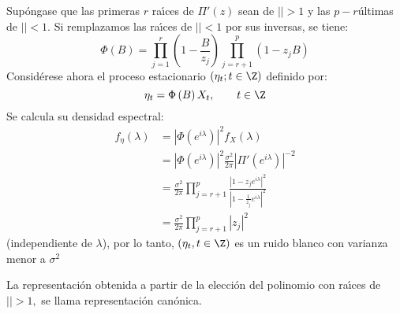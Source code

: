 \begin{observacion}
\begin{enumerate}
Sup\'{o}ngase que las primeras $r$ ra\'{\i}ces de $\Pi'(z)$ sean de 
$\left| \right|>1$ y las $p-r $\'{u}ltimas de $\left| \right|<1$. Si remplazamos 
las ra\'{\i}ces de $\left| \right|<1$ por sus inversas, se tiene: 
\[
\Phi (B)=\prod_{j=1}^{r} \left( {1-\frac{B}{z_{j} }} 
\right)\prod_{j=r+1}^{p} \left( {1-z_{j} B} \right)
\]
Consid\'{e}rese ahora el proceso estacionario $\left( {\eta_{t} ;t\in \Z} \right)$ definido por:
\[
\eta_{t} =\Phi \left( B \right)X_{t} ,
\qquad t\in \Z
\]
Se calcula su densidad espectral: 
\begin{align*}
 f_{\eta } (\lambda )
	&=\left| {\Phi \left( {e^{i\lambda }} \right)} \right|^{2}f_{X} (\lambda )\\
	&=\left| {\Phi \left( {e^{i\lambda }} \right)} \right|^{2}\frac{\sigma^{2}}{2\pi}\left| {\Pi'\left( {e^{i\lambda }} \right)} \right|^{-2}\\
	&=\frac{\sigma^{2}}{2\pi }\prod_{j=r+1}^{p} \frac{\left| {1-z_{j} e^{i\lambda }} \right|^{2}}{\left| {1-\frac{1}{z_{j} }e^{i\lambda }} \right|^{2}}\\
	&=\frac{\sigma^{2}}{2\pi }\prod_{j=r+1}^{p} \left| {z_{j} } \right|^{2}
\end{align*}
(independiente de $\lambda$), por lo tanto, $\left( {\eta_{t},t\in \Z} \right)$ es un ruido blanco con varianza menor a $\sigma^{2}$

La representaci\'{o}n obtenida a partir de la elecci\'{o}n del polinomio con 
ra\'{\i}ces de $\left| \right|>1,$ se llama representaci\'{o}n can\'{o}nica.
\end{enumerate}
\end{observacion}


